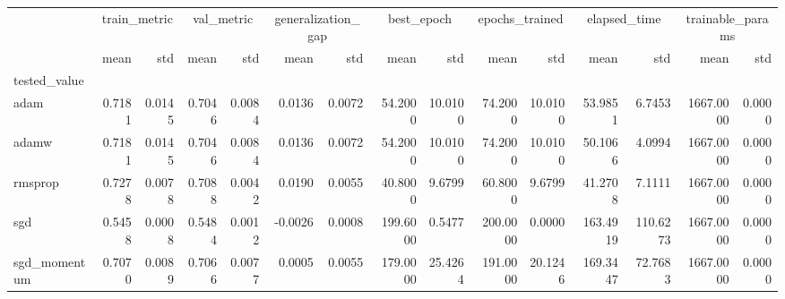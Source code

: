 \begin{tabular}{lrrrrrrrrrrrrrr}
\toprule
 & \multicolumn{2}{c}{train_metric} & \multicolumn{2}{c}{val_metric} & \multicolumn{2}{c}{generalization_gap} & \multicolumn{2}{c}{best_epoch} & \multicolumn{2}{c}{epochs_trained} & \multicolumn{2}{c}{elapsed_time} & \multicolumn{2}{c}{trainable_params} \\
 & mean & std & mean & std & mean & std & mean & std & mean & std & mean & std & mean & std \\
tested_value &  &  &  &  &  &  &  &  &  &  &  &  &  &  \\
\midrule
adam & 0.7181 & 0.0145 & 0.7046 & 0.0084 & 0.0136 & 0.0072 & 54.2000 & 10.0100 & 74.2000 & 10.0100 & 53.9851 & 6.7453 & 1667.0000 & 0.0000 \\
adamw & 0.7181 & 0.0145 & 0.7046 & 0.0084 & 0.0136 & 0.0072 & 54.2000 & 10.0100 & 74.2000 & 10.0100 & 50.1066 & 4.0994 & 1667.0000 & 0.0000 \\
rmsprop & 0.7278 & 0.0078 & 0.7088 & 0.0042 & 0.0190 & 0.0055 & 40.8000 & 9.6799 & 60.8000 & 9.6799 & 41.2708 & 7.1111 & 1667.0000 & 0.0000 \\
sgd & 0.5458 & 0.0008 & 0.5484 & 0.0012 & -0.0026 & 0.0008 & 199.6000 & 0.5477 & 200.0000 & 0.0000 & 163.4919 & 110.6273 & 1667.0000 & 0.0000 \\
sgd_momentum & 0.7070 & 0.0089 & 0.7066 & 0.0077 & 0.0005 & 0.0055 & 179.0000 & 25.4264 & 191.0000 & 20.1246 & 169.3447 & 72.7683 & 1667.0000 & 0.0000 \\
\bottomrule
\end{tabular}
